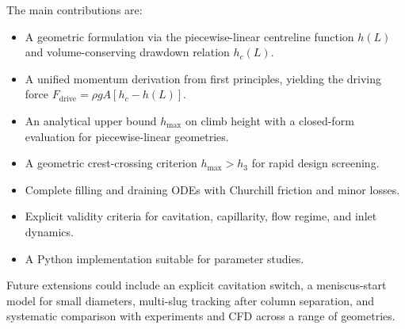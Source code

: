 \documentclass[11pt]{article}
\theoremstyle{definition}
\begin{document}
The main contributions are:
\begin{itemize}[nosep]
  \item A geometric formulation via the piecewise-linear centreline function $h(L)$ and 
        volume-conserving drawdown relation $h_c(L)$.
  \item A unified momentum derivation from first principles, yielding the driving force 
        $F_{\text{drive}} = \rho g A[h_c - h(L)]$.
  \item An analytical upper bound $h_{\max}$ on climb height with a closed-form evaluation 
        for piecewise-linear geometries.
\item A geometric crest-crossing criterion $h_{\max} > h_3$ for rapid design screening.
  \item Complete filling and draining ODEs with Churchill friction and minor losses.
  \item Explicit validity criteria for cavitation, capillarity, flow regime, and inlet 
        dynamics.
  \item A Python implementation suitable for parameter studies.
\end{itemize}

Future extensions could include an explicit cavitation switch, a meniscus-start model for 
small diameters, multi-slug tracking after column separation, and systematic comparison 
with experiments and CFD across a range of geometries.
\end{document}
